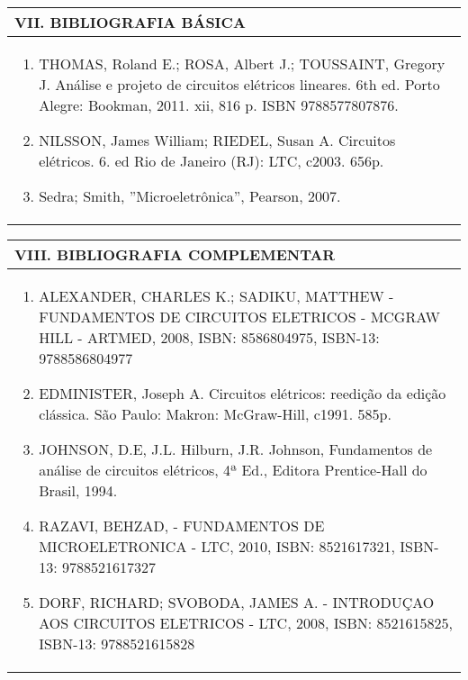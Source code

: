 \documentclass[12pt]{article}
\begin{document}
\newpage

\begin{longtable}{|L{1.025\textwidth}|} \hline
%
{\bf VII. BIBLIOGRAFIA BÁSICA} \\ \hline
\begin{enumerate}
%
\item THOMAS, Roland E.; ROSA, Albert J.; TOUSSAINT, Gregory J. Análise e projeto de circuitos elétricos lineares. 6th ed. Porto Alegre: Bookman, 2011. xii, 816 p. ISBN 9788577807876. 
\item NILSSON, James William; RIEDEL, Susan A. Circuitos elétricos. 6. ed Rio de Janeiro (RJ): LTC, c2003. 656p. 
\item Sedra; Smith, ''Microeletrônica'', Pearson, 2007.
%

\end{enumerate}
 \\ \hline
\end{longtable}



\begin{longtable}{|L{1.025\textwidth}|} \hline
%
{\bf VIII. BIBLIOGRAFIA COMPLEMENTAR} \\ \hline
\begin{enumerate}

\item ALEXANDER, CHARLES K.; SADIKU, MATTHEW - FUNDAMENTOS DE CIRCUITOS ELETRICOS - MCGRAW HILL - ARTMED, 2008, ISBN: 8586804975, ISBN-13: 9788586804977 
\item EDMINISTER, Joseph A. Circuitos elétricos: reedição da edição clássica. São Paulo: Makron: McGraw-Hill, c1991. 585p. 
\item JOHNSON, D.E, J.L. Hilburn, J.R. Johnson, Fundamentos de análise de circuitos elétricos, 4ª Ed., Editora Prentice-Hall do Brasil, 1994. 
\item RAZAVI, BEHZAD, - FUNDAMENTOS DE MICROELETRONICA - LTC, 2010, ISBN: 8521617321, ISBN-13: 9788521617327 
\item DORF, RICHARD; SVOBODA, JAMES A. - INTRODUÇAO AOS CIRCUITOS ELETRICOS - LTC, 2008, ISBN: 8521615825, ISBN-13: 9788521615828 

%
\end{enumerate}
 \\ \hline
\end{longtable}



\end{document}
